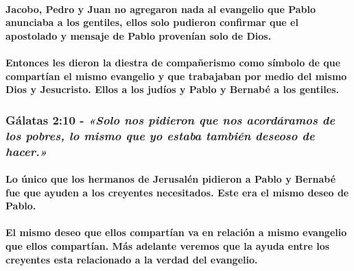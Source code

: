 \documentclass[11a pt,twoside]{article}
\newcommand{\scripture}[1]{%
  {\fontsize{12pt}{16pt}\selectfont\ScriptureFont\itshape #1}%
}
\let\oldsubsubsection\subsubsection
\renewcommand{\subsubsection}{\needspace{4\baselineskip}\oldsubsubsection}
\let\oldparagraph\paragraph
\renewcommand{\paragraph}{\needspace{3\baselineskip}\oldparagraph}
\begin{document}
\paragraph{Jacobo, Pedro y Juan no agregaron nada al evangelio que Pablo
anunciaba a los gentiles, ellos solo pudieron confirmar que el
apostolado y mensaje de Pablo provenían solo de
Dios.}\label{jacobo-pedro-y-juan-no-agregaron-nada-al-evangelio-que-pablo-anunciaba-a-los-gentiles-ellos-solo-pudieron-confirmar-que-el-apostolado-y-mensaje-de-pablo-provenuxedan-solo-de-dios.}

\paragraph{Entonces les dieron la diestra de compañerismo como símbolo
de que compartían el mismo evangelio y que trabajaban por medio del
mismo Dios y Jesucristo. Ellos a los judíos y Pablo y Bernabé a los
gentiles.}\label{entonces-les-dieron-la-diestra-de-compauxf1erismo-como-suxedmbolo-de-que-compartuxedan-el-mismo-evangelio-y-que-trabajaban-por-medio-del-mismo-dios-y-jesucristo.-ellos-a-los-juduxedos-y-pablo-y-bernabuxe9-a-los-gentiles.}

\subsubsection{\texorpdfstring{Gálatas 2:10 -
\scripture{«Solo nos pidieron que nos acordáramos de los pobres, lo mismo que yo estaba también deseoso de hacer.»}}{Gálatas 2:10 - }}\label{guxe1latas-210---solo-nos-pidieron-que-nos-acorduxe1ramos-de-los-pobres-lo-mismo-que-yo-estaba-tambiuxe9n-deseoso-de-hacer.}

\paragraph{Lo único que los hermanos de Jerusalén pidieron a Pablo y
Bernabé fue que ayuden a los creyentes necesitados. Este era el mismo
deseo de
Pablo.}\label{lo-uxfanico-que-los-hermanos-de-jerusaluxe9n-pidieron-a-pablo-y-bernabuxe9-fue-que-ayuden-a-los-creyentes-necesitados.-este-era-el-mismo-deseo-de-pablo.}

\paragraph{El mismo deseo que ellos compartían va en relación a mismo
evangelio que ellos compartían. Más adelante veremos que la ayuda entre
los creyentes esta relacionado a la verdad del
evangelio.}\label{el-mismo-deseo-que-ellos-compartuxedan-va-en-relaciuxf3n-a-mismo-evangelio-que-ellos-compartuxedan.-muxe1s-adelante-veremos-que-la-ayuda-entre-los-creyentes-esta-relacionado-a-la-verdad-del-evangelio.}
\end{document}
